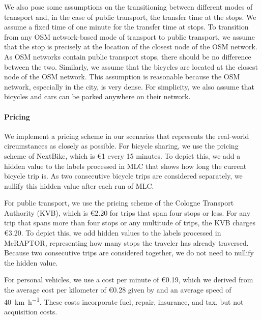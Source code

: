 We also pose some assumptions on the transitioning between different modes of transport and, in the case of public transport, the transfer time at the stops.
We assume a fixed time of one minute for the transfer time at stops.
To transition from any OSM network-based mode of transport to public transport, we assume that the stop is precisely at the location of the closest node of the OSM network.
As OSM networks contain public transport stops, there should be no difference between the two.
Similarly, we assume that the bicycles are located at the closest node of the OSM network.
This assumption is reasonable because the OSM network, especially in the city, is very dense.
For simplicity, we also assume that bicycles and cars can be parked anywhere on their network.


\paragraph{Pricing}

We implement a pricing scheme in our scenarios that represents the real-world circumstances as closely as possible.
For bicycle sharing, we use the pricing scheme of NextBike, which is \euro{1} every 15 minutes.
To depict this, we add a hidden value to the labels processed in MLC that shows how long the current bicycle trip is.
As two consecutive bicycle trips are considered separately, we nullify this hidden value after each run of MLC.

For public transport, we use the pricing scheme of the Cologne Transport Authority (KVB), which is \euro{2.20} for trips that span four stops or less.
For any trip that spans more than four stops or any multitude of trips, the KVB charges \euro{3.20}.
To depict this, we add hidden values to the labels processed in McRAPTOR, representing how many stops the traveler has already traversed.
Because two consecutive trips are considered together, we do not need to nullify the hidden value.

For personal vehicles, we use a cost per minute of \euro{0.19}, which we derived from the average cost per kilometer of \euro{0.28} given by \cite{kieferSpritkostenrechner2023} and an average speed of \SI{40}{\kilo\meter\per\hour}.
These costs incorporate fuel, repair, insurance, and tax, but not acquisition costs.

